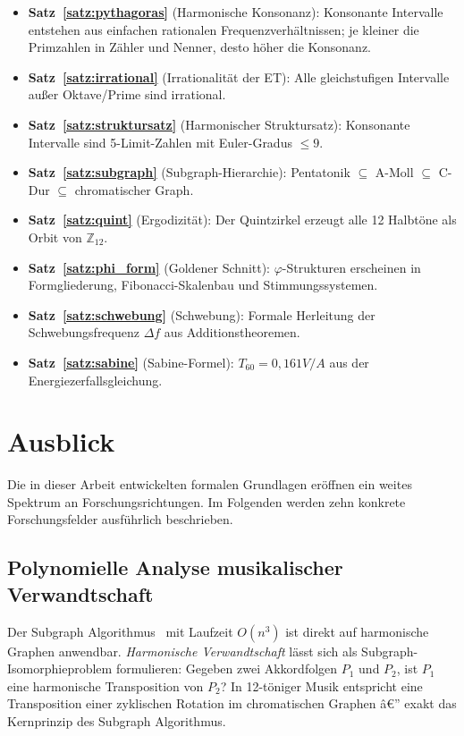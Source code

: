 ﻿\documentclass[a4paper,12pt]{article}
\theoremstyle{definition}
\begin{document}
\begin{itemize}
    \item \textbf{Satz~\ref{satz:pythagoras}} (Harmonische Konsonanz): Konsonante
          Intervalle entstehen aus einfachen rationalen Frequenzverhältnissen;
          je kleiner die Primzahlen in Zähler und Nenner, desto höher die Konsonanz.
    \item \textbf{Satz~\ref{satz:irrational}} (Irrationalität der ET): Alle
          gleichstufigen Intervalle außer Oktave/Prime sind irrational.
    \item \textbf{Satz~\ref{satz:struktursatz}} (Harmonischer Struktursatz):
          Konsonante Intervalle sind 5-Limit-Zahlen mit Euler-Gradus $\leq 9$.
    \item \textbf{Satz~\ref{satz:subgraph}} (Subgraph-Hierarchie): Pentatonik
          $\subseteq$ A-Moll $\subseteq$ C-Dur $\subseteq$ chromatischer Graph.
    \item \textbf{Satz~\ref{satz:quint}} (Ergodizität): Der Quintzirkel erzeugt
          alle 12 Halbtöne als Orbit von $\mathbb{Z}_{12}$.
    \item \textbf{Satz~\ref{satz:phi_form}} (Goldener Schnitt): $\varphi$-Strukturen
          erscheinen in Formgliederung, Fibonacci-Skalenbau und Stimmungssystemen.
    \item \textbf{Satz~\ref{satz:schwebung}} (Schwebung): Formale Herleitung der
          Schwebungsfrequenz $\Delta f$ aus Additionstheoremen.
    \item \textbf{Satz~\ref{satz:sabine}} (Sabine-Formel): $T_{60} = 0{,}161 V/A$
          aus der Energiezerfallsgleichung.
\end{itemize}

\section{Ausblick}

Die in dieser Arbeit entwickelten formalen Grundlagen eröffnen ein weites Spektrum
an Forschungsrichtungen. Im Folgenden werden zehn konkrete Forschungsfelder
ausführlich beschrieben.

\subsection{Polynomielle Analyse musikalischer Verwandtschaft}

Der Subgraph Algorithmus~\cite{epp2026subgraph} mit Laufzeit $O(n^3)$ ist direkt
auf harmonische Graphen anwendbar. \emph{Harmonische Verwandtschaft} lässt sich als
Subgraph-Isomorphieproblem formulieren: Gegeben zwei Akkordfolgen $P_1$ und $P_2$,
ist $P_1$ eine harmonische Transposition von $P_2$? In 12-töniger Musik entspricht
eine Transposition einer zyklischen Rotation im chromatischen Graphen â€” exakt das
Kernprinzip des Subgraph Algorithmus.
\end{document}
